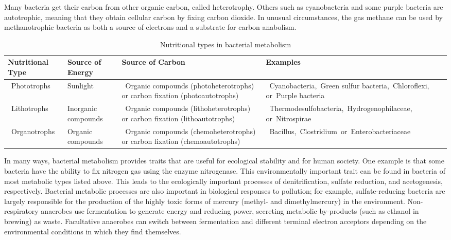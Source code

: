 Many bacteria get their carbon from other organic carbon, called heterotrophy. Others such as cyanobacteria and some purple bacteria are autotrophic, meaning that they obtain cellular carbon by fixing carbon dioxide. In unusual circumstances, the gas methane can be used by methanotrophic bacteria as both a source of electrons and a substrate for carbon anabolism.

\onecolumn
\begin{table} 


\caption{\label{tab:bacteriametabo}Nutritional types in bacterial metabolism}
\centering
\begin{tabular}[t]{>{\raggedright\arraybackslash}p{5em}>{\raggedright\arraybackslash}p{10em}>{\raggedright\arraybackslash}p{20em}>{\raggedright\arraybackslash}p{30em}}
\toprule
Nutritional Type & Source of Energy & Source of Carbon & Examples\\
\midrule
\rowcolor{gray!6}   Phototrophs  & Sunlight &  Organic compounds (photoheterotrophs) or carbon fixation (photoautotrophs) &  Cyanobacteria, Green sulfur bacteria, Chloroflexi, or Purple bacteria \\
 Lithotrophs & Inorganic compounds &  Organic compounds (lithoheterotrophs) or carbon fixation (lithoautotrophs) &  Thermodesulfobacteria, Hydrogenophilaceae, or Nitrospirae \\
\rowcolor{gray!6}   Organotrophs & Organic compounds &  Organic compounds (chemoheterotrophs) or carbon fixation (chemoautotrophs)   &  Bacillus, Clostridium or Enterobacteriaceae \\
\bottomrule
\end{tabular}

\end{table}

\twocolumn

In many ways, bacterial metabolism provides traits that are useful for ecological stability and for human society. One example is that some bacteria have the ability to fix nitrogen gas using the enzyme nitrogenase. This environmentally important trait can be found in bacteria of most metabolic types listed above. This leads to the ecologically important processes of denitrification, sulfate reduction, and acetogenesis, respectively. Bacterial metabolic processes are also important in biological responses to pollution; for example, sulfate-reducing bacteria are largely responsible for the production of the highly toxic forms of mercury (methyl- and dimethylmercury) in the environment. Non-respiratory anaerobes use fermentation to generate energy and reducing power, secreting metabolic by-products (such as ethanol in brewing) as waste. Facultative anaerobes can switch between fermentation and different terminal electron acceptors depending on the environmental conditions in which they find themselves.

